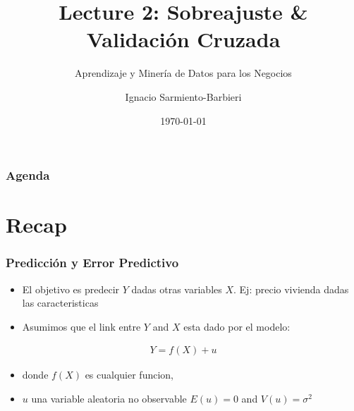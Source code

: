\documentclass[
  shownotes,
  xcolor={svgnames},
  hyperref={colorlinks,citecolor=DarkBlue,linkcolor=DarkRed,urlcolor=DarkBlue}
  , aspectratio=169]{beamer}
\begin{document}
\title{Lecture 2:  Sobreajuste \&  Validación Cruzada}
\subtitle{Aprendizaje y Minería de Datos para los Negocios}
\date{\today}

\author[Sarmiento-Barbieri]{Ignacio Sarmiento-Barbieri}


\begin{frame}[noframenumbering]
\maketitle
\end{frame}





\begin{frame}
\frametitle{Agenda}

\tableofcontents


\end{frame}
\section{Recap}
\begin{frame}
\frametitle{Predicción y Error Predictivo}


\begin{itemize}
  \item El objetivo es predecir $Y$ dadas otras variables $X$. Ej: precio vivienda dadas las caracteristicas
  \bigskip
  \item Asumimos que el link entre $Y$ and $X$ esta dado por el modelo:
\end{itemize}
\bigskip
\begin{align}
  Y = f(X) + u
\end{align}
\bigskip
\begin{itemize}
  \item donde $f(X)$ es cualquier funcion, 
  \bigskip
  \item  $u$ una variable aleatoria no observable $E(u)=0$ and $V(u) = \sigma^2$
\end{itemize}


\end{frame}
\end{document}
